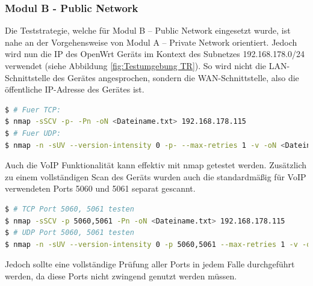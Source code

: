 \documentclass[a4paper]{book}
\begin{document}
\begin{large}
\subsubsection{Modul B - Public Network}
\begin{onehalfspace}
Die Teststrategie, welche für Modul B – Public Network eingesetzt wurde, ist nahe an der Vorgehensweise von Modul A – Private Network orientiert. Jedoch wird nun die IP des OpenWrt Geräts im Kontext des Subnetzes 192.168.178.0/24 verwendet (siehe Abbildung \ref{fig:Testumgebung TR}). So wird nicht die LAN-Schnittstelle des Gerätes angesprochen, sondern die WAN-Schnittstelle, also die öffentliche IP-Adresse des Gerätes ist.\\

\begin{lstlisting}[language=sh,caption={nmap Kommandos zum Scannen der WAN-Schnittstelle von OpenWrt. Das erste Kommando scannt TCP, das zweite UDP. Die angegebene IP-Adresse ist die des OpenWrt Routers.}]
$ # Fuer TCP:
$ nmap -sSCV -p- -Pn -oN <Dateiname.txt> 192.168.178.115
$ # Fuer UDP:
$ nmap -n -sUV --version-intensity 0 -p- --max-retries 1 -v -oN <Dateiname.txt> 192.168.178.115
\end{lstlisting}

\noindent Auch die VoIP Funktionalität kann effektiv mit nmap getestet werden. Zusätzlich zu einem vollständigen Scan des Geräts wurden auch die standardmäßig für VoIP verwendeten Ports 5060 und 5061 separat gescannt. \vfill \pagebreak

\begin{lstlisting}[language=sh,caption={Kommandos zum gezielten Scan der Ports 5060, 5061 mit nmap.}]
$ # TCP Port 5060, 5061 testen
$ nmap -sSCV -p 5060,5061 -Pn -oN <Dateiname.txt> 192.168.178.115
$ # UDP Port 5060, 5061 testen
$ nmap -n -sUV --version-intensity 0 -p 5060,5061 --max-retries 1 -v -oN <Dateiname.txt> 192.168.178.115
\end{lstlisting}

\noindent Jedoch sollte eine vollständige Prüfung aller Ports in jedem Falle durchgeführt werden, da diese Ports nicht zwingend genutzt werden müssen. 	

\end{onehalfspace}


\end{large}
\end{document}
